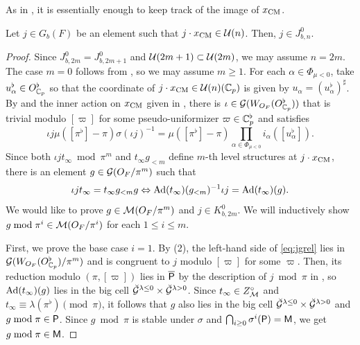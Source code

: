\documentclass[12pt,reqno]{amsart}
\begin{document}
As in , it is essentially enough to keep track of the image of $x_{\operatorname{CM}}$. 

\begin{lem} \label{lem:image_CM_outside}
    Let $j \in G_b(F)$ be an element such that $j \cdot x_{\operatorname{CM}} \in {\mathcal{U}}(n)$. Then, $j \in J_{b, n}^0$. 
\end{lem}
\begin{proof}
    Since $J_{b, 2m}^0 = J_{b, 2m + 1}^0$ and ${\mathcal{U}}(2m + 1) \subset {\mathcal{U}}(2m)$, we may assume $n = 2m$. The case $m = 0$ follows from , so we may assume $m \geq 1$. For each $\alpha \in \Phi_{\mu < 0}$, take $u_\alpha^\flat \in O_{\mathbb{C}_p}^\flat$ so that the coordinate of $j \cdot x_{\operatorname{CM}} \in {\mathcal{U}}(n)(\mathbb{C}_p)$ is given by $u_\alpha = (u_\alpha^\flat)^\sharp$. By  and the inner action on $x_{\operatorname{CM}}$ given in \cite[Remark 2.11, Proposition 2.15]{Tak25z}, there is $\iota \in {\mathcal{G}}(W_{O_F}(O_{\mathbb{C}_p}^\flat))$ that is trivial modulo $[\varpi]$ for some pseudo-uniformizer $\varpi \in \mathbb{C}_p^\flat$ and satisfies 
    \[
        \iota j \mu([\pi^\flat] - \pi) \sigma(\iota j)^{-1} = \mu([\pi^\flat]-\pi) \prod_{\alpha \in \Phi_{\mu<0}} i_\alpha([u_\alpha^\flat]). 
    \]
    Since both $\iota j t_\infty \bmod \pi^m$ and $t_\infty g_{<m}$ define $m$-th level structures at $j \cdot x_{\operatorname{CM}}$, there is an element $g \in {\mathcal{G}}(O_F / \pi^m)$ such that 
    \begin{equation} \label{eq:jgrel}
        \iota j t_\infty = t_\infty g_{<m} g \Leftrightarrow {\operatorname{Ad}}(t_\infty)(g_{<m})^{-1} \iota j = {\operatorname{Ad}}(t_\infty)(g).  
    \end{equation}
    We would like to prove $g \in {\mathcal{M}}(O_F / \pi^m)$ and $j \in K_{b, 2m}^0$. We will inductively show $g \bmod \pi^i \in {\mathcal{M}}(O_F / \pi^i)$ for each $1 \leq i \leq m$. 
    
    First, we prove the base case $i = 1$. By  (2), the left-hand side of \eqref{eq:jgrel} lies in ${\mathcal{G}}(W_{O_F}(O_{\mathbb{C}_p}^\flat) / \pi^m)$ and is congruent to $j$ modulo $[\varpi]$ for some $\varpi$. Then, its reduction modulo $(\pi, [\varpi])$ lies in ${\mathsf{{\overline{P}}}}$ by the description of $j \bmod \pi$ in \cite[Lemma 5.6]{Tak25z}, so ${\operatorname{Ad}}(t_\infty)(g)$ lies in the big cell ${\mathcal{\breve{G}}}^{\lambda \leq 0} \times {\mathcal{\breve{G}}}^{\lambda > 0}$. Since $t_\infty \in Z_{{\mathcal{M}}}^\circ$ and $t_\infty \equiv \lambda(\pi^\flat) \pmod{\pi}$, it follows that $g$ also lies in the big cell ${\mathcal{\breve{G}}}^{\lambda \leq 0} \times {\mathcal{\breve{G}}}^{\lambda > 0}$ and $g \bmod \pi \in {\mathsf{P}}$. Since $g \bmod \pi$ is stable under $\sigma$ and $\bigcap_{i \geq 0} \sigma^i({\mathsf{P}}) = {\mathsf{M}}$, we get $g \bmod \pi \in {\mathsf{M}}$. 


\end{proof}
\end{document}
